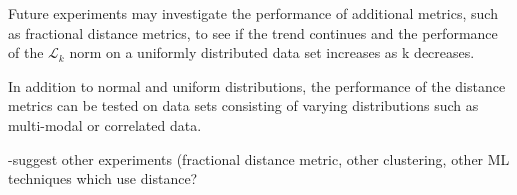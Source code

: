 \documentclass{article}
\begin{document}
Future experiments may investigate the performance of additional metrics, such as fractional distance metrics, to see if the trend continues and the performance of the $\mathcal{L}_k$ norm on a uniformly distributed data set increases as k decreases.

In addition to normal and uniform distributions, the performance of the distance metrics can be tested on data sets consisting of varying distributions such as multi-modal or correlated data.

-suggest other experiments (fractional distance metric, other clustering, other ML techniques which use distance?
	


\end{document}
